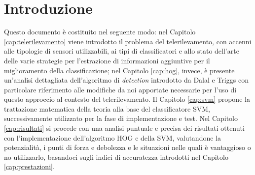 

\chapter{Introduzione}
\label{Introduzione}


Questo documento è costituito nel seguente modo: nel Capitolo \ref{cap:telerilevamento} viene introdotto il problema del telerilevamento, con accenni alle tipologie di sensori utilizzabili, ai tipi di classificatori e allo stato dell'arte delle varie strategie per l'estrazione di informazioni aggiuntive per il miglioramento della classificazione; nel Capitolo \ref{cap:hog}, invece, è presente un'analisi dettagliata dell'algoritmo di \emph{detection} introdotto da Dalal e Triggs \citep{Art_HOGHuman} con particolare riferimento alle modifiche da noi apportate necessarie per l'uso di questo approccio al contesto del telerilevamento. Il Capitolo \ref{cap:svm} propone la trattazione matematica della teoria alla base del classificatore SVM, successivamente utilizzato per la fase di implementazione e test. 
Nel Capitolo \ref{cap:risultati} si procede con una analisi puntuale e precisa dei risultati ottenuti con l'implementazione dell'algoritmo HOG e della SVM, valutandone la potenzialità, i punti di forza e debolezza e le situazioni nelle quali è vantaggioso o no utilizzarlo, basandoci sugli indici di accuratezza introdotti nel Capitolo \ref{cap:prestazioni}.